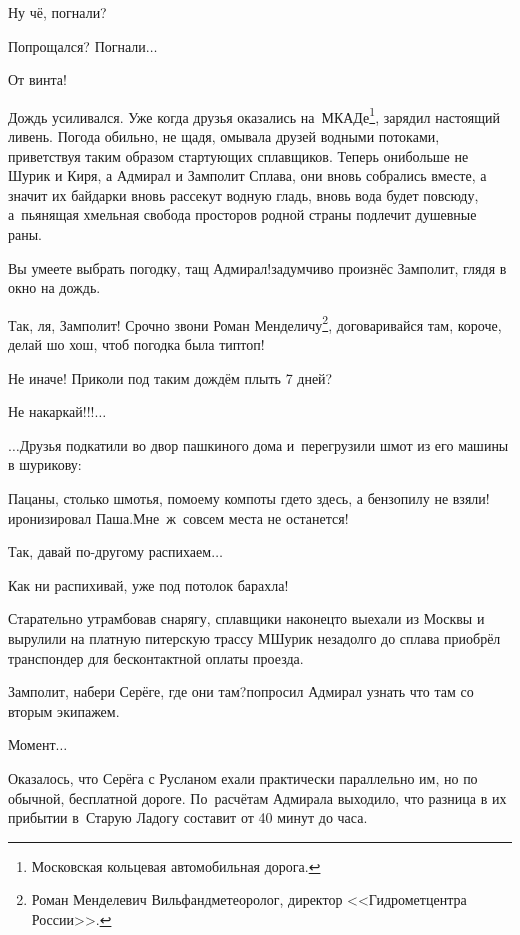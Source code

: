 \diagdash Ну чё, погнали?

\diagdash Попрощался? Погнали$\ldots$

\diagdash От винта!

\renewcommand*{\thefootnote}{\arabic{footnote}}

Дождь усиливался. Уже когда друзья оказались на~МКАДе\footnote{Московская кольцевая автомобильная дорога.}, зарядил настоящий ливень. Погода обильно, не щадя, омывала друзей водными потоками, приветствуя таким образом стартующих сплавщиков. Теперь они\mdash больше не Шурик и Киря, а Адмирал и Замполит Сплава, они вновь собрались вместе, а значит их байдарки вновь рассекут водную гладь, вновь вода будет повсюду, а~пьянящая хмельная свобода просторов родной страны подлечит душевные раны.

\diagdash Вы умеете выбрать погодку, тащ Адмирал!\mdash задумчиво произнёс Замполит, глядя в окно на дождь.

\diagdash Так, ля, Замполит! Срочно звони Роман Менделичу\footnote{Роман Менделевич Вильфанд\mdash метеоролог, директор <<Гидрометцентра России>>.}, договаривайся там, короче, делай шо хош, чтоб погодка была тип\sdash топ!

\diagdash Не иначе! Приколи под таким дождём плыть 7 дней?

\diagdash Не накаркай!!!$\ldots$

$\ldots$Друзья подкатили во двор пашкиного дома и~перегрузили шмот из его машины в шурикову:

\diagdash Пацаны, столько шмотья, по\sdash моему компоты где\sdash то здесь, а бензопилу не взяли!\mdash иронизировал Паша.\mdash Мне~ж~совсем места не останется!

\diagdash Так, давай по-другому распихаем$\ldots$

\diagdash Как ни распихивай, уже под потолок барахла!

Старательно утрамбовав снарягу, сплавщики наконец\sdash то выехали из Москвы и вырулили на платную питерскую трассу М\mdash Шурик незадолго до сплава приобрёл транспондер для бесконтактной оплаты проезда.

\diagdash Замполит, набери Серёге, где они там?\mdash попросил Адмирал узнать что там со вторым экипажем.

\diagdash Момент$\ldots$

Оказалось, что Серёга с Русланом ехали практически параллельно им, но по обычной, бесплатной дороге. По~расчётам Адмирала выходило, что разница в их прибытии в~Старую Ладогу составит от 40 минут до часа.

